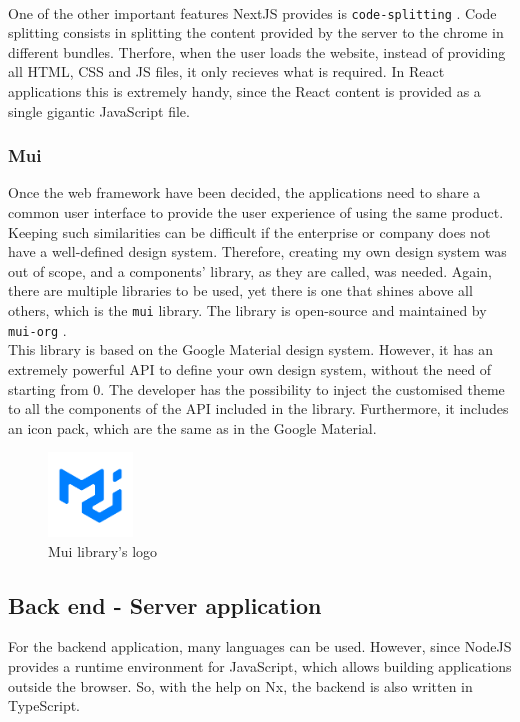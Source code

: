 \documentclass[a4paper, 12pt, oneside]{book}
\begin{document}
\\[8pt]
One of the other important features NextJS provides is \texttt{code-splitting} \cite{code-splitting}. Code splitting consists in splitting the content provided by the server to the chrome in different bundles. Therfore, when the user loads the website, instead of providing all HTML, CSS and JS files, it only recieves what is required. In React applications this is extremely handy, since the React content is provided as a single gigantic JavaScript file.
\subsubsection{Mui}
Once the web framework have been decided, the applications need to share a common user interface to provide the user experience of using the same product. Keeping such similarities can be difficult if the enterprise or company does not have a well-defined design system. Therefore, creating my own design system was out of scope, and a components' library, as they are called, was needed. Again, there are multiple libraries to be used, yet there is one that shines above all others, which is the \texttt{mui} library. The library is open-source and maintained by \texttt{mui-org} \cite{mui}.
\\[8pt]
This library is based on the Google Material design system. However, it has an extremely powerful API to define your own design system, without the need of starting from 0. The developer has the possibility to inject the customised theme to all the components of the API included in the library. Furthermore, it includes an icon pack, which are the same as in the Google Material.
\begin{figure}[H]
	\centering
	\includegraphics[width=0.2\textwidth]{assets/mui-logo.png}
	\caption{Mui library's logo}
\end{figure}
\subsection{Back end - Server application}
For the backend application, many languages can be used. However, since NodeJS provides a runtime environment for JavaScript, which allows building applications outside the browser. So, with the help on Nx, the backend is also written in TypeScript.
\end{document}
